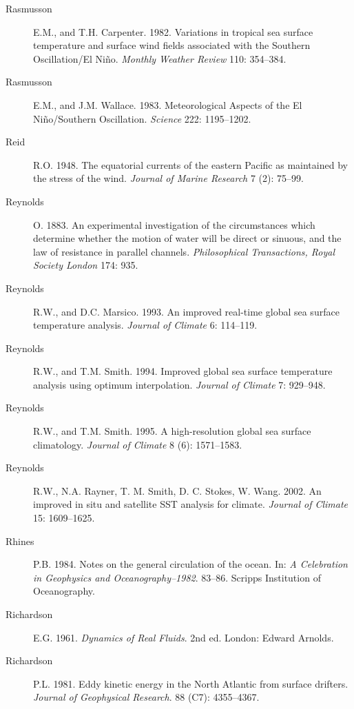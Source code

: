 \begin{description}
\item [Rasmusson]E.M., and T.H. Carpenter. 1982. Variations in
  tropical sea surface temperature and surface wind fields associated
  with the Southern Oscillation/El Ni\~{n}o. \textit{Monthly Weather
    Review} 110: 354--384.

\item [Rasmusson]E.M., and J.M. Wallace. 1983. Meteorological Aspects
  of the El Ni\~{n}o/Southern Oscillation. \textit{Science} 222:
  1195--1202.

\item [Reid]R.O. 1948. The equatorial currents of the eastern Pacific
  as maintained by the stress of the wind. \textit{Journal of Marine
    Research} 7 (2): 75--99.

\item [Reynolds]O. 1883. An experimental investigation of the
  circumstances which determine whether the motion of water will be
  direct or sinuous, and the law of resistance in parallel
  channels. \textit{Philosophical Transactions, Royal Society London}
  174: 935.

\item [Reynolds]R.W., and D.C. Marsico. 1993. An improved real-time
  global sea surface temperature analysis. \textit{Journal of Climate}
  6: 114--119.

\item [Reynolds]R.W., and T.M. Smith. 1994. Improved global sea
  surface temperature analysis using optimum
  interpolation. \textit{Journal of Climate} 7: 929--948.

\item [Reynolds]R.W., and T.M. Smith. 1995. A high-resolution global
  sea surface climatology. \textit{Journal of Climate} 8 (6):
  1571--1583.

\item [Reynolds]R.W., N.A. Rayner, T. M. Smith, D. C. Stokes,
  W. Wang. 2002. An improved in situ and satellite SST analysis for
  climate. \textit{Journal of Climate} 15: 1609--1625.

\item [Rhines]P.B. 1984. Notes on the general circulation of the
  ocean. In: \textit{A Celebration in Geophysics and
    Oceanography--1982}. 83--86. Scripps Institution of Oceanography.

\item [Richardson]E.G. 1961. \textit{Dynamics of Real Fluids}. 2nd
  ed. London: Edward Arnolds.

\item [Richardson]P.L. 1981. Eddy kinetic energy in the North Atlantic
  from surface drifters. \textit{Journal of Geophysical Research}. 88
  (C7): 4355--4367.


\end{description}
